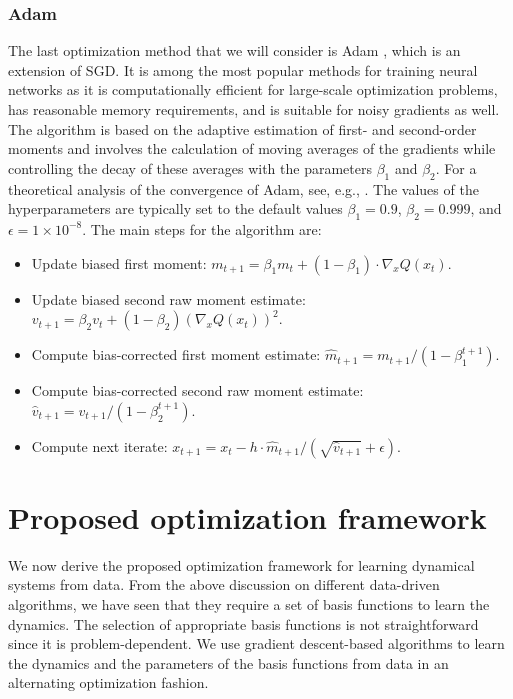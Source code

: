 \documentclass
[
    a4paper,
    DIV=11,
    abstract=true,
    11pt,
]
{scrartcl}
\theoremstyle{definition}
\begin{document}
\subsubsection{Adam}

The last optimization method that we will consider is Adam \cite{kingma2014adam}, which is an extension of SGD. It is among the most popular methods for training neural networks as it is computationally efficient for large-scale optimization problems, has reasonable memory requirements, and is suitable for noisy gradients as well. The algorithm is based on the adaptive estimation of first- and second-order moments and involves the calculation of moving averages of the gradients while controlling the decay of these averages with the parameters $\beta_1$ and $\beta_2$. For a theoretical analysis of the convergence of Adam, see, e.g., \cite{fossez2022a, chen2018on}. The values of the hyperparameters are typically set to the default values $\beta_1 = 0.9$, $\beta_2 = 0.999$, and $\epsilon = 1\times 10^{-8}$. The main steps for the algorithm are:
\begin{itemize}
    \item Update biased first moment: $m_{t+1} = \beta_1 m_t + (1-\beta_1) \cdot \nabla_x Q(x_{t})$.
    \item Update biased second raw moment estimate: $v_{t+1} = \beta_2 v_t + (1-\beta_2) (\nabla_x Q(x_{t}))^2$.
    \item Compute bias-corrected first moment estimate: $\hat{m}_{t+1} = m_{t+1}/(1 - \beta_1^{t+1})$.
    \item Compute bias-corrected second raw moment estimate: $\hat{v}_{t+1} = v_{t+1}/(1 - \beta_2^{t+1})$.
    \item Compute next iterate: $x_{t+1} = x_{t} - h \cdot \hat{m}_{t+1}/(\sqrt{\hat{v}_{t+1}} + \epsilon)$.
\end{itemize}


\section{Proposed optimization framework}
\label{sec:proposed_algos}

We now derive the proposed optimization framework for learning dynamical systems from data. From the above discussion on different data-driven algorithms, we have seen that they require a set of basis functions to learn the dynamics. The selection of appropriate basis functions is not straightforward since it is problem-dependent. We use gradient descent-based algorithms to learn the dynamics and the parameters of the basis functions from data in an alternating optimization fashion.
\end{document}
